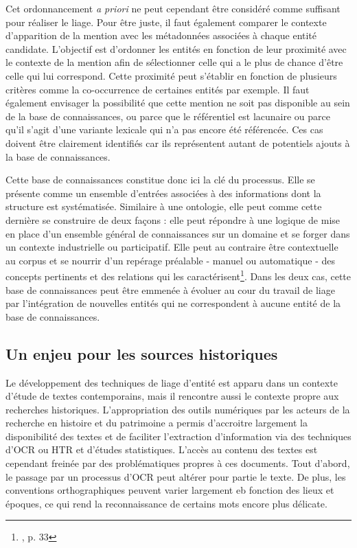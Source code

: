 \documentclass[a4paper,12pt,twoside]{book}
\begin{document}
	Cet ordonnancement \textit{a priori} ne peut cependant être considéré comme suffisant pour réaliser le liage. Pour être juste, il faut également comparer le contexte d'apparition de la mention avec les métadonnées associées à chaque entité candidate. L'objectif est d'ordonner les entités en fonction de leur proximité avec le contexte de la mention afin de sélectionner celle qui a le plus de chance d'être celle qui lui correspond. Cette proximité peut s'établir en fonction de plusieurs critères comme la co-occurrence de certaines entités par exemple. Il faut également envisager la possibilité que cette mention ne soit pas disponible au sein de la base de connaissances, ou parce que le référentiel est lacunaire ou parce qu'il s'agit d'une variante lexicale qui n'a pas encore été référencée. Ces cas doivent être clairement identifiés car ils représentent autant de potentiels ajouts à la base de connaissances.
	
	Cette base de connaissances constitue donc ici la clé du processus. Elle se présente comme un ensemble d'entrées associées à des informations dont la structure est systématisée. Similaire à une ontologie, elle peut comme cette dernière se construire de deux façons : elle peut répondre à une logique de mise en place d'un ensemble général de connaissances sur un domaine et se forger dans un contexte industrielle ou participatif. Elle peut au contraire être contextuelle au corpus et se nourrir d'un repérage préalable - manuel ou automatique - des concepts pertinents et des relations qui les caractérisent\footnote{\cite{stern_identification_2013}, p. 33}. Dans les deux cas, cette base de connaissances peut être emmenée à évoluer au cour du travail de liage par l'intégration de nouvelles entités qui ne correspondent à aucune entité de la base de connaissances.
	
	\subsection{Un enjeu pour les sources historiques}
	
	Le développement des techniques de liage d'entité est apparu dans un contexte d'étude de textes contemporains, mais il rencontre aussi le contexte propre aux recherches historiques. L'appropriation des outils numériques par les acteurs de la recherche en histoire et du patrimoine a permis d'accroitre largement la disponibilité des textes et de faciliter l'extraction d'information via des techniques d'OCR ou HTR et d'études statistiques. L'accès au contenu des textes est cependant freinée par des problématiques propres à ces documents. Tout d'abord, le passage par un processus d'OCR peut altérer pour partie le texte. De plus, les conventions orthographiques peuvent varier largement eb fonction des lieux et époques, ce qui rend la reconnaissance de certains mots encore plus délicate.
	
\end{document}

